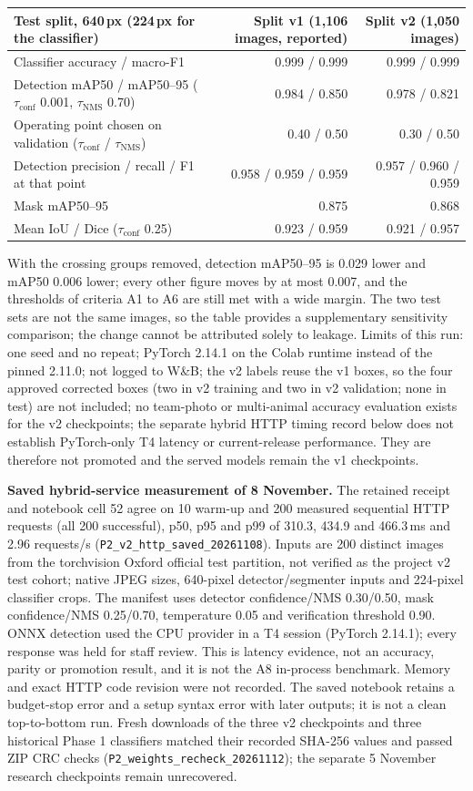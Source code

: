 \documentclass[11pt,a4paper]{article}
\newcommand{\tconf}{$\tau_{\text{conf}}$}
\newcommand{\tnms}{$\tau_{\text{NMS}}$}
\newcommand{\ev}[1]{\nolinkurl{#1}}
\begin{document}
\begin{tabularx}{\linewidth}{@{}Y r r@{}}
\toprule
Test split, 640\,px (224\,px for the classifier) & Split v1 (1,106 images, reported) & Split v2 (1,050 images) \\
\midrule
Classifier accuracy / macro-F1 & 0.999 / 0.999 & 0.999 / 0.999 \\
Detection mAP50 / mAP50--95 (\tconf{} 0.001, \tnms{} 0.70) & 0.984 / 0.850 & 0.978 / 0.821 \\
Operating point chosen on validation (\tconf{} / \tnms{}) & 0.40 / 0.50 & 0.30 / 0.50 \\
Detection precision / recall / F1 at that point & 0.958 / 0.959 / 0.959 & 0.957 / 0.960 / 0.959 \\
Mask mAP50--95 & 0.875 & 0.868 \\
Mean IoU / Dice (\tconf{} 0.25) & 0.923 / 0.959 & 0.921 / 0.957 \\
\bottomrule
\end{tabularx}

With the crossing groups removed, detection mAP50--95 is 0.029 lower and mAP50 0.006 lower; every other figure moves by at most 0.007, and the thresholds of criteria A1 to A6 are still met with a wide margin. The two test sets are not the same images, so the table provides a supplementary sensitivity comparison; the change cannot be attributed solely to leakage. Limits of this run: one seed and no repeat; PyTorch 2.14.1 on the Colab runtime instead of the pinned 2.11.0; not logged to W\&B; the v2 labels reuse the v1 boxes, so the four approved corrected boxes (two in v2 training and two in v2 validation; none in test) are not included; no team-photo or multi-animal accuracy evaluation exists for the v2 checkpoints; the separate hybrid HTTP timing record below does not establish PyTorch-only T4 latency or current-release performance. They are therefore not promoted and the served models remain the v1 checkpoints.

\textbf{Saved hybrid-service measurement of 8 November.} The retained receipt and notebook cell 52 agree on 10 warm-up and 200 measured sequential HTTP requests (all 200 successful), p50, p95 and p99 of 310.3, 434.9 and 466.3\,ms and 2.96 requests/s (\ev{P2_v2_http_saved_20261108}). Inputs are 200 distinct images from the torchvision Oxford official test partition, not verified as the project v2 test cohort; native JPEG sizes, 640-pixel detector/segmenter inputs and 224-pixel classifier crops. The manifest uses detector confidence/NMS 0.30/0.50, mask confidence/NMS 0.25/0.70, temperature 0.05 and verification threshold 0.90. ONNX detection used the CPU provider in a T4 session (PyTorch 2.14.1); every response was held for staff review. This is latency evidence, not an accuracy, parity or promotion result, and it is not the A8 in-process benchmark. Memory and exact HTTP code revision were not recorded. The saved notebook retains a budget-stop error and a setup syntax error with later outputs; it is not a clean top-to-bottom run. Fresh downloads of the three v2 checkpoints and three historical Phase 1 classifiers matched their recorded SHA-256 values and passed ZIP CRC checks (\ev{P2_weights_recheck_20261112}); the separate 5 November research checkpoints remain unrecovered.
\end{document}
